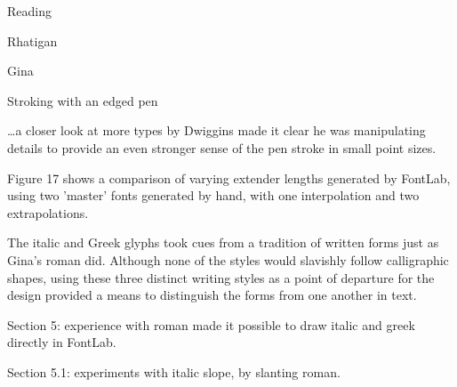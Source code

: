 \documentclass[11pt]{PalisadesLakesBook}
\begin{document}
\begin{plSection}{Reading}
\begin{plSection}{Rhatigan}
\begin{plSection}{Gina}
\begin{plSection}{}
\begin{plDiagram}{Stroking with an edged pen}{}
\center
{}
\end{plDiagram}

\begin{plQuote}{}{}
\ldots a closer look at more types 
by Dwiggins made it clear he was manipulating details to provide 
an even stronger sense of the pen stroke in small point sizes.
\end{plQuote}

Figure 17 shows a comparison of varying extender lengths
generated by FontLab, using two 'master' fonts generated by hand,
with one interpolation and two extrapolations.

\begin{plQuote}{}{}
The italic and Greek glyphs took cues from a tradition of
written forms just as Gina's roman did.
Although none of the styles would slavishly follow calligraphic 
shapes,
using these three distinct writing styles as a point of departure
for the design provided a means to distinguish the forms from one
another in text.
\end{plQuote}

Section 5: experience with roman made it possible
to draw italic and greek directly in FontLab.

Section 5.1: experiments with italic slope, by slanting roman.


\end{plSection}
\end{plSection}
\end{plSection}
\end{plSection}
\end{document}
